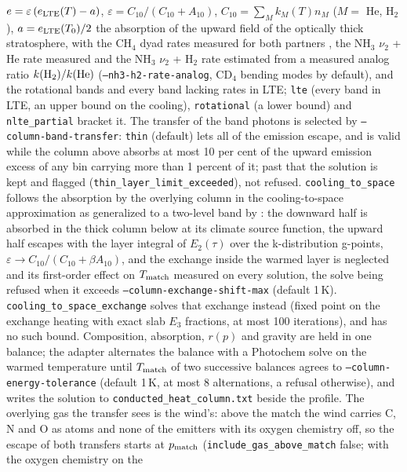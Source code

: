 $e = \varepsilon\,(e_{\rm LTE}(T)-a)$,
$\varepsilon = C_{10}/(C_{10}+A_{10})$,
$C_{10} = \sum_M k_M(T)n_M$ ($M =$ He, H$_2$), $a = e_{\rm LTE}(T_0)/2$ the
absorption of the upward field of the optically thick stratosphere, with the
CH$_4$ dyad rates measured for both partners \citep{Siddles1994,
MenardBourcin2005}, the NH$_3$ $\nu_2$ + He rate measured
\citep{HovisMoore1980} and the NH$_3$ $\nu_2$ + H$_2$ rate estimated from a
measured analog ratio $k({\rm H_2})/k({\rm He})$ (\texttt{--nh3-h2-rate-analog},
CD$_4$ bending modes by default), and the rotational bands and every band
lacking rates in LTE; \texttt{lte} (every band in LTE, an upper bound on the
cooling), \texttt{rotational} (a lower bound) and \texttt{nlte\_partial}
bracket it. The transfer of the band photons is selected by
\texttt{--column-band-transfer}: \texttt{thin} (default) lets all of the
emission escape, and is valid while the column above absorbs at most 10 per
cent of the upward emission excess of any bin carrying more than 1 percent
of it; past that the solution is kept and flagged
(\texttt{thin\_layer\_limit\_exceeded}), not refused.
\texttt{cooling\_to\_space} follows the absorption by the overlying column in
the cooling-to-space approximation as generalized to a two-level band by
\citet[Eqs.~5, 30 and 33]{Dickinson1972}: the downward half is absorbed in
the thick column below at its climate source function, the upward half
escapes with the layer integral of $E_2(\tau)$ over the k-distribution
g-points, $\varepsilon\to C_{10}/(C_{10}+\beta A_{10})$, and the exchange
inside the warmed layer is neglected and its first-order effect on
$T_{\rm match}$ measured on every solution, the solve being refused when it
exceeds \texttt{--column-exchange-shift-max} (default 1\,K).
\texttt{cooling\_to\_space\_exchange} solves that exchange instead (fixed
point on the exchange heating with exact slab $E_3$ fractions, at most 100
iterations), and has no such bound. Composition, absorption, $r(p)$ and
gravity are held in one balance; the adapter alternates the balance with a
Photochem solve on the warmed temperature until $T_{\rm match}$ of two
successive balances agrees to \texttt{--column-energy-tolerance} (default
1\,K, at most 8 alternations, a refusal otherwise), and writes the solution
to \texttt{conducted\_heat\_column.txt} beside the profile. The overlying
gas the transfer sees is the wind's: above the match the wind carries C, N
and O as atoms and none of the emitters with its oxygen chemistry off, so
the escape of both transfers starts at $p_{\rm match}$
(\texttt{include\_gas\_above\_match} false; with the oxygen chemistry on the
